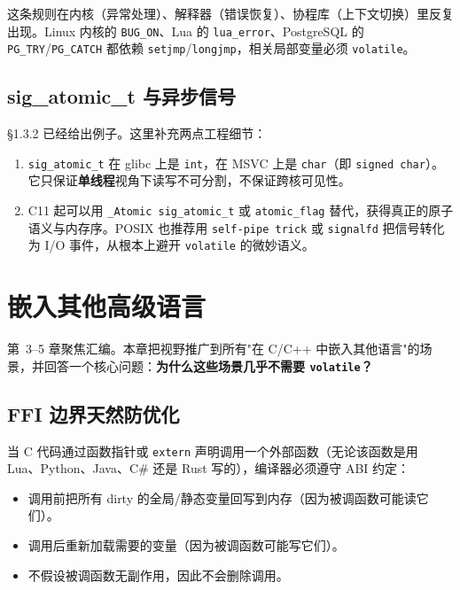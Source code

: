 \documentclass[12pt,a4paper,fontset=fandol]{ctexbook}
\newcommand{\cpp}[1]{C++#1}
\newcommand{\kw}[1]{\texttt{#1}}
\begin{document}
这条规则在内核（异常处理）、解释器（错误恢复）、协程库（上下文切换）里反复出现。Linux 内核的 \texttt{BUG\_ON}、Lua 的 \texttt{lua\_error}、PostgreSQL 的 \texttt{PG\_TRY}/\allowbreak{}\texttt{PG\_CATCH} 都依赖 \texttt{setjmp}/\allowbreak{}\texttt{longjmp}，相关局部变量必须 \kw{volatile}。

\section{sig\_atomic\_t 与异步信号}\label{sec:sig-atomic}

§1.3.2 已经给出例子。这里补充两点工程细节：

\begin{enumerate}[nosep]
  \item \texttt{sig\_atomic\_t} 在 glibc 上是 \texttt{int}，在 MSVC 上是 \texttt{char}（即 \texttt{signed char}）。它只保证\textbf{单线程}视角下读写不可分割，不保证跨核可见性。
  \item C11 起可以用 \texttt{\_Atomic sig\_atomic\_t} 或 \texttt{atomic\_flag} 替代，获得真正的原子语义与内存序。POSIX 也推荐用 \texttt{self-pipe trick} 或 \texttt{signalfd} 把信号转化为 I/O 事件，从根本上避开 \kw{volatile} 的微妙语义。
\end{enumerate}

\chapter{嵌入其他高级语言}\label{ch:ffi}

第~3--5 章聚焦汇编。本章把视野推广到所有"在 C/\allowbreak{}\cpp{} 中嵌入其他语言"的场景，并回答一个核心问题：\textbf{为什么这些场景几乎不需要 \kw{volatile}？}

\section{FFI 边界天然防优化}\label{sec:ffi-natural}

当 C 代码通过函数指针或 \texttt{extern} 声明调用一个外部函数（无论该函数是用 Lua、Python、Java、C\# 还是 Rust 写的），编译器必须遵守 ABI 约定：

\begin{itemize}[nosep]
  \item 调用前把所有 dirty 的全局/静态变量回写到内存（因为被调函数可能读它们）。
  \item 调用后重新加载需要的变量（因为被调函数可能写它们）。
  \item 不假设被调函数无副作用，因此不会删除调用。
\end{itemize}
\end{document}
